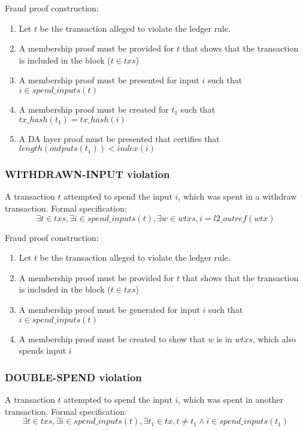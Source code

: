\documentclass[../midgard.tex]{subfiles}
\begin{document}
Fraud proof construction:
\begin{enumerate}
  \item Let $t$ be the transaction alleged to violate the ledger rule. 
  \item A membership proof must be provided for $t$ that shows that the transaction is included in the block ($t \in txs$)
  \item A membership proof must be presented for input $i$ such that $i \in spend\_inputs(t)$
  \item A membership proof must be created for $t_1$ such that $tx\_hash(t_1) = tx\_hash(i)$
  \item A DA layer proof must be presented that certifies that $length(outputs(t_1)) < index(i)$ \todo
\end{enumerate}

\subsubsection{WITHDRAWN-INPUT violation}
\label{violation:WITHDRAWN-INPUT}
A transaction $t$ attempted to spend the input $i$, which was spent in a withdraw transaction.
Formal specification:
\begin{equation*}
    \exists t \in txs, \exists i \in spend\_inputs(t), \exists w \in wtxs, i = l2\_outref(wtx)
\end{equation*}

Fraud proof construction:
\begin{enumerate}
  \item Let $t$ be the transaction alleged to violate the ledger rule. 
  \item A membership proof must be provided for $t$ that shows that the transaction is included in the block ($t \in txs$)
  \item A membership proof must be generated for input $i$ such that $i \in spend\_inputs(t)$
  \item A membership proof must be created to show that $w$ is in $wtxs$, which also spends input $i$
\end{enumerate}

\subsubsection{DOUBLE-SPEND violation}
\label{violation:DOUBLE-SPEND}
A transaction $t$ attempted to spend the input $i$, which was spent in another transaction.
Formal specification:
\begin{equation*}
    \exists t \in txs, \exists i \in spend\_inputs(t), \exists t_1 \in tx, t \neq t_1 \land i \in spend\_inputs(t_1)
\end{equation*}
\end{document}

